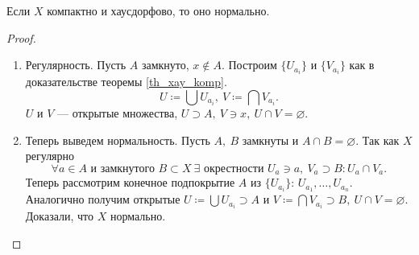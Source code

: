 \documentclass[11pt]{book}
\theoremstyle{definition}
\theoremstyle{plain}
\theoremstyle{plain}
\theoremstyle{definition}
\theoremstyle{remark}
\begin{document}
\begin{thm}
    Если $ X$ компактно и хаусдорфово, то оно нормально.
\end{thm}
\begin{proof}
    $ $
    \begin{enumerate}
	\item Регулярность.  Пусть $ A$ замкнуто,  $ x \not\in A$. Построим $ \{U_{a_i}\}$ и $ \{V_{a_i}\}$ как в доказательстве теоремы \ref{th_xay_komp}.
	    \[
		U \coloneqq \bigcup U_{a_i}, ~ V \coloneqq \bigcap V_{a_i}
	    .\]
	    $ U \text{ и } V$ --- открытые множества,  $ U \supset A, ~V \ni x, ~ U \cap V = \varnothing$.
	\item Теперь выведем нормальность. Пусть $ A, ~ B$ замкнуты и  $ A \cap B = \varnothing$. Так как $ X$ регулярно
	    \[
		\forall a \in  A \text{ и замкнутого }  B \subset X ~ \exists \text{ окрестности } U_{a} \ni a, ~ V_a \supset B: U_a  \cap V_a
	    .\]
	    Теперь рассмотрим конечное подпокрытие $ A$ из $ \{U_{a_i}\}$: $ U_{a_1}, \ldots , U_{a_n}$.
	    Аналогично получим открытые $ U \coloneqq \bigcup U_{a_i} \supset A$ и $ V \coloneqq \bigcap V_{a_i} \supset B, ~ U \cap V = \varnothing$. Доказали, что $ X$ нормально.
    \end{enumerate}
\end{proof}
\end{document}
